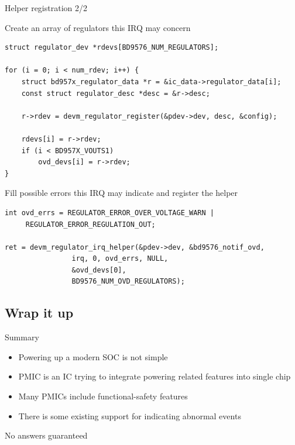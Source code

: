 \documentclass[10pt]{beamer}
\begin{document}
\begin{frame}[fragile]{Helper registration 2/2}
\lstset{language=C}
\scriptsize

Create an array of regulators this IRQ may concern
\pause
\begin{lstlisting}
struct regulator_dev *rdevs[BD9576_NUM_REGULATORS];

for (i = 0; i < num_rdev; i++) {
	struct bd957x_regulator_data *r = &ic_data->regulator_data[i];
	const struct regulator_desc *desc = &r->desc;

	r->rdev = devm_regulator_register(&pdev->dev, desc, &config);

	rdevs[i] = r->rdev;
	if (i < BD957X_VOUTS1)
		ovd_devs[i] = r->rdev;
}
\end{lstlisting}
\pause
Fill possible errors this IRQ may indicate and register the helper
\pause
\begin{lstlisting}
int ovd_errs = REGULATOR_ERROR_OVER_VOLTAGE_WARN |
	 REGULATOR_ERROR_REGULATION_OUT;

ret = devm_regulator_irq_helper(&pdev->dev, &bd9576_notif_ovd,
				irq, 0, ovd_errs, NULL,
				&ovd_devs[0],
				BD9576_NUM_OVD_REGULATORS);

\end{lstlisting}
\end{frame}


\addtocounter{framenumber}{-1}
\begin{frame}[plain]
\section{Wrap it up}
\end{frame}

\begin{frame}{Summary}
\begin{itemize}
	\item Powering up a modern SOC is not simple
	\item PMIC is an IC trying to integrate powering related features into single chip
	\item Many PMICs include functional-safety features
	\item There is some existing support for indicating abnormal events
\end{itemize}
\end{frame}

\begin{frame}{No answers guaranteed}
\center
{}
\end{frame}
\end{document}
